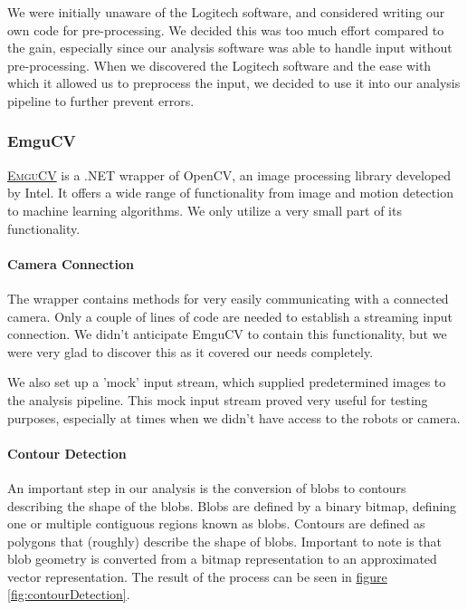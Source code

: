 \documentclass[10pt, abstracton, twocolumn]{scrartcl}
\newcommand{\fref}[1]{\hyperref[#1]{figure \vref{#1}}}
\newcommand{\link}[2]{\textsc{\href{#1}{#2}}}
\begin{document}
We were initially unaware of the Logitech software, and considered writing our own code for pre-processing. We decided this was too much effort compared to the gain, especially since our analysis software was able to handle input without pre-processing. When we discovered the Logitech software and the ease with which it allowed us to preprocess the input, we decided to use it into our analysis pipeline to further prevent errors.

\subsubsection{EmguCV}
\link{http://www.emgu.com/wiki/index.php/Main_Page}{EmguCV} is a .NET wrapper of OpenCV, an image processing library developed by Intel. It offers a wide range of functionality from image and motion detection to machine learning algorithms. We only utilize a very small part of its functionality.

\paragraph{Camera Connection}
The wrapper contains methods for very easily communicating with a connected camera. Only a couple of lines of code are needed to establish a streaming input connection. We didn't anticipate EmguCV to contain this functionality, but we were very glad to discover this as it covered our needs completely.

We also set up a 'mock' input stream, which supplied predetermined images to the analysis pipeline. This mock input stream proved very useful for testing purposes, especially at times when we didn't have access to the robots or camera.

\paragraph{Contour Detection}
An important step in our analysis is the conversion of blobs to contours describing the shape of the blobs. Blobs are defined by a binary bitmap, defining one or multiple contiguous regions known as blobs. Contours are defined as polygons that (roughly) describe the shape of blobs. Important to note is that blob geometry is converted from a bitmap representation to an approximated vector representation. The result of the process can be seen in \fref{fig:contourDetection}.
\end{document}
